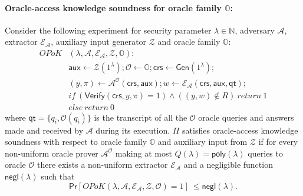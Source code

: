 \begin{definition}
\paragraph{Oracle-access knowledge soundness for oracle family $\mathbb{O}$:} Consider the following experiment for security 
parameter $\lambda \in \mathbb{N}$, adversary $\mathcal{A}$, extractor $\mathcal{E}_{\mathcal{A}}$, auxiliary 
input generator $\mathcal{Z}$ and oracle family $\mathbb{O}$:\\
\begin{align*}
\mathit{OPoK}&(\lambda, \mathcal{A}, \mathcal{E}_{\mathcal{A}}, \mathcal{Z}, \mathbb{O}): \\
& \mathsf{aux} \leftarrow \mathcal{Z}(1^{\lambda}); \mathcal{O} \leftarrow \mathbb{O}; \mathsf{crs} \leftarrow \mathsf{Gen}(1^{\lambda}); \\
& (y,\pi) \leftarrow \mathcal{A}^{\mathcal{O}}(\mathsf{crs},\mathsf{aux}); w \leftarrow \mathcal{E}_{\mathcal{A}}(\mathsf{crs}, \mathsf{aux}, \mathsf{qt}); \\
& \mathit{if} \ (\mathsf{Verify}(\mathsf{crs}, y, \pi) = 1) \wedge ((y,w) \notin R) \ \mathit{return}  \ 1 \\
& \mathit{else} \ \mathit{return} \ 0
\end{align*}
\noindent where $\mathsf{qt} = \{q_i, \mathcal{O}(q_i)\}$ is the transcript of all the $\mathcal{O}$ oracle queries and answers made and received by 
$\mathcal{A}$ during its execution. $\Pi$ satisfies oracle-access knowledge soundness with respect to oracle family  $\mathbb{O}$ and auxiliary 
input from $\mathcal{Z}$ if for every non-uniform oracle prover $\mathcal{A}^{\mathcal{O}}$  
making at most $Q(\lambda) = \mathsf{poly}(\lambda)$ queries to oracle $\mathcal{O}$ there exists a non-uniform extractor 
$\mathcal{E}_{\mathcal{A}}$ and a negligible function $\mathsf{negl}(\lambda)$ such that 
$$\mathsf{Pr}[\mathit{OPoK}(\lambda, \mathcal{A}, \mathcal{E}_{\mathcal{A}}, \mathcal{Z}, \mathcal{O}) =  1]\ \leq \mathsf{negl}(\lambda).$$ 
\end{definition} 


